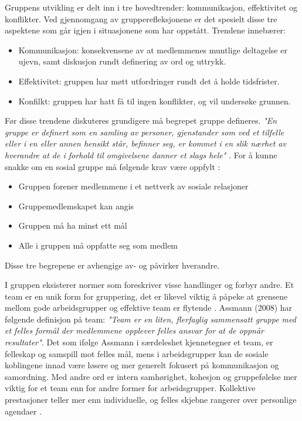 Gruppens utvikling er delt inn i tre hovedtrender: kommunikasjon, effektivitet og konflikter.
Ved gjennomgang av grupperefleksjonene er det spesielt disse tre aspektene som går igjen i situasjonene som har oppstått. Trendene innebærer:

\begin{itemize}
\item Kommunikasjon: konsekvensene av at medlemmenes muntlige deltagelse er ujevn, samt diskusjon rundt definering av ord og uttrykk.
\item Effektivitet: gruppen har møtt utfordringer rundt det å holde tidsfrister.
\item Konfilkt: gruppen har hatt få til ingen konflikter, og vil undersøke grunnen.
\end{itemize}

Før disse trendene diskuteres grundigere må begrepet gruppe defineres. 
\emph{"En gruppe er definert som en samling av personer, gjenstander som ved et tilfelle eller i en eller annen hensikt står, befinner seg, er kommet i en slik nærhet av hverandre at de i forhold til omgivelsene danner et slags hele"} \cite{prosjekteringsledelse}.
For å kunne snakke om en sosial gruppe må følgende krav være oppfylt \cite{orgorg}:
\begin{itemize}
\item Gruppen forener medlemmene i et nettverk av sosiale relasjoner
\item Gruppemedlemskapet kan angis
\item Gruppen må ha minst ett mål
\item Alle i gruppen må oppfatte seg som medlem
\end{itemize}

Disse tre begrepene er avhengige av- og påvirker hverandre.

I gruppen eksisterer normer som foreskriver visse handlinger og forbyr andre.
Et team er en unik form for gruppering, det er likevel viktig å påpeke at grensene mellom gode arbeidsgrupper og effektive team er flytende \cite{orgorg}.
Assmann (2008) har følgende definisjon på team: \emph{"Team er en liten, flerfaglig sammensatt gruppe med et felles formål der medlemmene opplever felles ansvar for at de oppnår resultater"}.
Det som ifølge Assmann i særdeleshet kjennetegner et team, er felleskap og samspill mot felles mål, mens i arbeidsgrupper kan de sosiale koblingene innad være løsere og mer generelt fokusert på kommunikasjon og samordning.
Med andre ord er intern samhørighet, kohesjon og gruppefølelse mer viktig for et team enn for andre former for arbeidsgrupper.
Kollektive prestasjoner teller mer enn individuelle, og felles skjebne rangerer over personlige agendaer \cite{orgorg}.